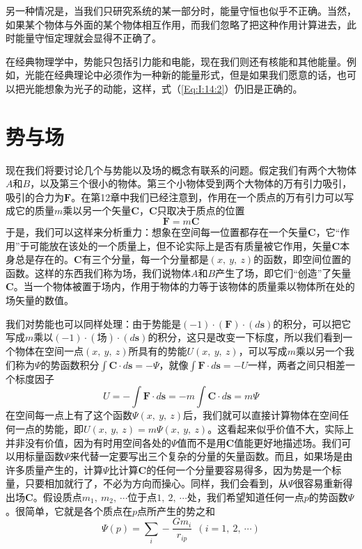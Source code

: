 另一种情况是，当我们只研究系统的某一部分时，能量守恒也似乎不正确。当然，如果某个物体与外面的某个物体相互作用，而我们忽略了把这种作用计算进去，此时能量守恒定理就会显得不正确了。

在经典物理学中，势能只包括引力能和电能，现在我们则还有核能和其他能量。例如，光能在经典理论中必须作为一种新的能量形式，但是如果我们愿意的话，也可以把光能想象为光子的动能，这样，式（\ref{Eq:I:14:2}）仍旧是正确的。

\section{势与场}

现在我们将要讨论几个与势能以及场的概念有联系的问题。假定我们有两个大物体$A$和$B$，以及第三个很小的物体。第三个小物体受到两个大物体的万有引力吸引，吸引的合力为$\boldsymbol{F}$。在第12章中我们已经注意到，作用在一个质点的万有引力可以写成它的质量$m$乘以另一个矢量$\boldsymbol{C}$，$\boldsymbol{C}$只取决于质点的位置
\begin{equation*}
    \boldsymbol{F}=m\boldsymbol{C}
\end{equation*}
于是，我们可以这样来分析重力：想象在空间每一位置都存在一个矢量$\boldsymbol{C}$，它“作用”于可能放在该处的一个质量上，但不论实际上是否有质量被它作用，矢量$\boldsymbol{C}$本身总是存在的。$\boldsymbol{C}$有三个分量，每一个分量都是$(x,~y,~z)$的函数，即空间位置的函数。这样的东西我们称为场，我们说物体$A$和$B$产生了场，即它们“创造”了矢量$\boldsymbol{C}$。当一个物体被置于场内，作用于物体的力等于该物体的质量乘以物体所在处的场矢量的数值。

我们对势能也可以同样处理：由于势能是$(-1) \cdot (\boldsymbol{F}) \cdot (d\boldsymbol{s})$的积分，可以把它写成$m$乘以$(-1) \cdot (\text{场}) \cdot (d\boldsymbol{s})$的积分，这只是改变一下标度，所以我们看到一个物体在空间一点$(x,~y,~z)$所具有的势能$U(x,~y,~z)$，可以写成$m$乘以另一个我们称为$\varPsi $的势函数积分$\int \boldsymbol{C} \cdot d\boldsymbol{s}=- \varPsi$，就像$\int \boldsymbol{F} \cdot d\boldsymbol{s}=-U$一样，两者之间只相差一个标度因子
\begin{equation}
    \label{Eq:I:14:7}
    U=-\int \boldsymbol{F} \cdot d\boldsymbol{s}=-m \int \boldsymbol{C} \cdot d\boldsymbol{s}=m \varPsi
\end{equation}
在空间每一点上有了这个函数$\varPsi(x,~y,~z)$后，我们就可以直接计算物体在空间任何一点的势能，即$U(x,~y,~z)=m\varPsi (x,~y,~z)$。这看起来似乎价值不大，实际上并非没有价值，因为有时用空间各处的$\varPsi$值而不是用$\boldsymbol{C}$值能更好地描述场。我们可以用标量函数$\varPsi$来代替一定要写出三个复杂的分量的矢量函数。而且，如果场是由许多质量产生的，计算$\varPsi$比计算$\boldsymbol{C}$的任何一个分量要容易得多，因为势是一个标量，只要相加就行了，不必为方向而操心。同样，我们会看到，从$\varPsi$很容易重新得出场$\boldsymbol{C}$。假设质点$m_1,~m_2,~ \cdots$位于点$1,~2,~\cdots$处，我们希望知道任何一点$p$的势函数$\varPsi$。很简单，它就是各个质点在$p$点所产生的势之和
\begin{equation}
    \label{Eq:I:14:8}
    \varPsi (p) = \sum_i - \frac{Gm_i}{r_{ip}} ~~(i=1,~2,~\cdots)
\end{equation}

